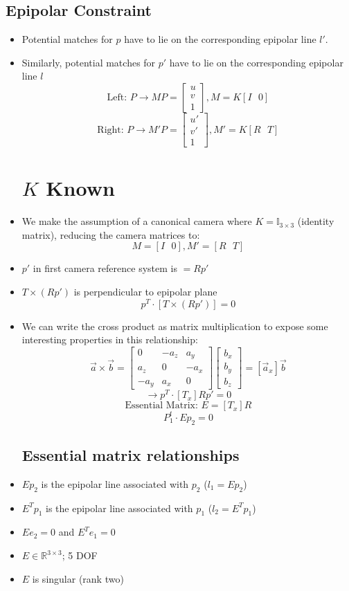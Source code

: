 \subsection{Epipolar Constraint}
\begin{itemize}
	\item Potential matches for $p$ have to lie on the corresponding epipolar line $l'$.
	\item Similarly, potential matches for $p'$ have to lie on the corresponding epipolar line $l$
	$$\text{Left: }P\to MP = \begin{bmatrix}
		u \\ v\\ 1
	\end{bmatrix}, M=K[I\text{ }0]$$
	$$\text{Right: }P\to M'P=\begin{bmatrix}
		u' \\ v' \\ 1
	\end{bmatrix}, M'=K[R\text{ }T]$$
	\section{$K$ Known}
	\item We make the assumption of a canonical camera where $K=\mathbb{I}_{3\times 3}$ (identity matrix), reducing the camera matrices to:
	$$M=[I\text{ }0], M'=[R\text{ }T]$$
	\item $p'$ in first camera reference system is $=Rp'$
	\item $T\times (Rp')$ is perpendicular to epipolar plane
		$$p^T\cdot [T\times(Rp')]=0$$
	\item We can write the cross product as matrix multiplication to expose some interesting properties in this relationship:
		$$\vec{a}\times\vec{b}=\begin{bmatrix}
			0 & -a_z & a_y \\
			a_z & 0 & -a_x \\
			-a_y & a_x & 0
		\end{bmatrix}\begin{bmatrix}
			b_x \\ b_y \\ b_z
		\end{bmatrix}=[\vec{a}_x]\vec{b}$$
		$$\to p^T\cdot[T_x]Rp'=0$$
		$$\text{Essential Matrix: }E=[T_x]R$$
		$$P_1^t\cdot E p_2 = 0$$
	\subsection{Essential matrix relationships}
	\item $Ep_2$ is the epipolar line associated with $p_2$ ($l_1=Ep_2$)
	\item $E^T p_1$ is the epipolar line associated with $p_1$ ($l_2 = E^T p_1$)
	\item $E e_2=0$ and $E^T e_1 =0$
	\item $E\in\mathbb{R}^{3\times 3}$; 5 DOF
	\item $E$ is singular (rank two)

\end{itemize}
